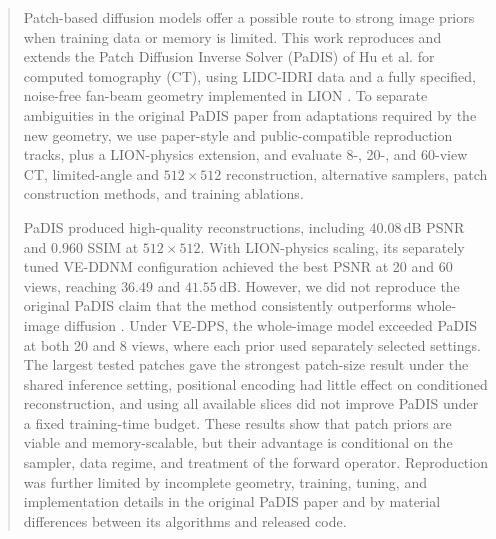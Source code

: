 \begin{abstract}
Patch-based diffusion models offer a possible route to strong image priors when training data or memory is limited. This work reproduces and extends the Patch Diffusion Inverse Solver (PaDIS) of Hu et al. \cite{} for computed tomography (CT), using LIDC-IDRI data \cite{} and a fully specified, noise-free fan-beam geometry implemented in LION \cite{}. To separate ambiguities in the original PaDIS paper from adaptations required by the new geometry, we use paper-style and public-compatible reproduction tracks, plus a LION-physics extension, and evaluate 8-, 20-, and 60-view CT, limited-angle and $512\times512$ reconstruction, alternative samplers, patch construction methods, and training ablations.

PaDIS produced high-quality reconstructions, including $40.08\,\mathrm{dB}$ PSNR and $0.960$ SSIM at $512\times512$. With LION-physics scaling, its separately tuned VE-DDNM configuration achieved the best PSNR at 20 and 60 views, reaching $36.49$ and $41.55\,\mathrm{dB}$. However, we did not reproduce the original PaDIS claim that the method consistently outperforms whole-image diffusion \cite{}. Under VE-DPS, the whole-image model exceeded PaDIS at both 20 and 8 views, where each prior used separately selected settings. The largest tested patches gave the strongest patch-size result under the shared inference setting, positional encoding had little effect on conditioned reconstruction, and using all available slices did not improve PaDIS under a fixed training-time budget. These results show that patch priors are viable and memory-scalable, but their advantage is conditional on the sampler, data regime, and treatment of the forward operator. Reproduction was further limited by incomplete geometry, training, tuning, and implementation details in the original PaDIS paper and by material differences between its algorithms and released code.
\end{abstract}
